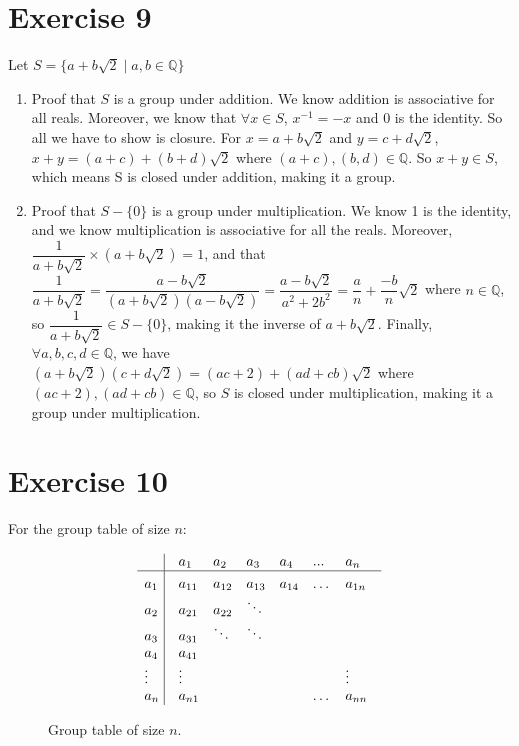 \documentclass{article}
\newcommand{\Q}{\mathbb{Q}}
\begin{document}
    \section*{Exercise 9}
    Let $S = \{a + b\sqrt{2} \mid a, b \in \Q\}$
    \begin{enumerate}[label=\textbf{\alph*.}]
        \item 
            Proof that $S$ is a group under addition.
            We know addition is associative for all reals.
            Moreover, we know that $\forall x \in S$, $x^{-1} = -x$
            and 0 is the identity.
            So all we have to show is closure.
            For $x = a + b\sqrt{2}$ and $y = c + d\sqrt{2}$,
            $x + y = (a + c) + (b + d)\sqrt{2}$
            where $(a + c), (b, d) \in \Q$.
            So $x + y \in S$,
            which means S is closed under addition, making it a group. 
        \item
            Proof that $S - \{0\}$ is a group under multiplication.
            We know 1 is the identity,
            and we know multiplication is associative for all the reals.
            Moreover, $\dfrac{1}{a + b\sqrt{2}} \times (a + b\sqrt{2}) = 1$,
            and that $\dfrac{1}{a + b\sqrt{2}}
            = \dfrac{a - b\sqrt{2}}{(a + b\sqrt{2})(a - b\sqrt{2})}
            = \dfrac{a - b\sqrt{2}}{a^{2} + 2b^{2}}
            = \dfrac{a}{n} + \dfrac{-b}{n}\sqrt{2}$
            where $n \in \Q$,
            so $\dfrac{1}{a + b\sqrt{2}} \in S - \{0\}$,
            making it the inverse of $a + b\sqrt{2}$.
            Finally, $\forall a, b, c, d \in \Q$,
            we have $(a + b\sqrt{2})(c + d\sqrt{2})
            = (ac + 2) + (ad + cb)\sqrt{2}$
            where $(ac + 2), (ad + cb) \in \Q$,
            so $S$ is closed under multiplication,
            making it a group under multiplication.
    \end{enumerate}


    \section*{Exercise 10}
    For the group table of size $n$:

    \begin{figure}[H]
        \centering

        \[\vbox{\tabskip0.5em\offinterlineskip
        \halign{\strut$#$\hfil\ \tabskip1em\vrule&&$#$\hfil\cr
        ~   & a_1   & a_2   & a_3 & a_4   & ...   & a_n   \cr
        \noalign{\hrule}\vrule height 12pt width 0pt
        a_1   & a_{11}   & a_{12}   & a_{13} & a_{14} & \dots & a_{1n} \cr
        a_2   & a_{21}   & a_{22} & \ddots \cr
        a_3   & a_{31}   & \ddots & \ddots \cr
        a_4   & a_{41} \cr
        \vdots & \vdots & & & & & \vdots \cr
        a_n   & a_{n1} & & & & \dots & a_{nn} \cr
        }}\]

        \caption{\label{fig:figure1} Group table of size $n$.}
    \end{figure}
\end{document}
